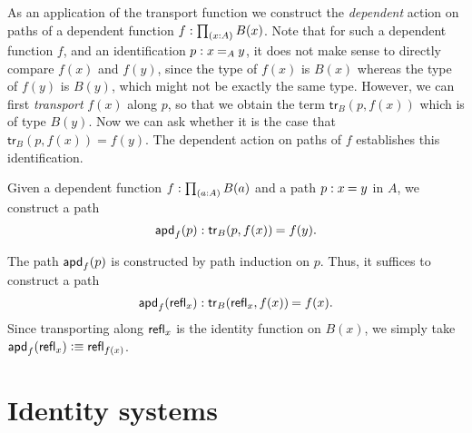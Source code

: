As an application of the transport function we construct the \emph{dependent} action on paths of a dependent function $f:\prd{x:A}B(x)$. Note that for such a dependent function $f$, and an identification $p:\id[A]{x}{y}$, it does not make sense to directly compare $f(x)$ and $f(y)$, since the type of $f(x)$ is $B(x)$ whereas the type of $f(y)$ is $B(y)$, which might not be exactly the same type. However, we can first \emph{transport} $f(x)$ along $p$, so that we obtain the term $\mathsf{tr}_B(p,f(x))$ which is of type $B(y)$. Now we can ask whether it is the case that $\mathsf{tr}_B(p,f(x))=f(y)$. The dependent action on paths of $f$ establishes this identification.

\begin{defn}\label{defn:apd}
Given a dependent function $f:\prd{a:A}B(a)$ and a path $p:\id{x}{y}$ in $A$, we construct a path
\begin{equation*}
\apd{f}{p} : \id{\mathsf{tr}_B(p,f(x))}{f(y)}.
\end{equation*}
\end{defn}

\begin{constr}
The path $\mathsf{apd}_{f}\mathopen{}\left(p\right)\mathclose{}$ is constructed by path induction on $p$. Thus, it suffices to construct a path
\begin{equation*}
\apd{f}{\refl{x}}:\id{\mathsf{tr}_B(\refl{x},f(x))}{f(x)}.
\end{equation*}
Since transporting along $\mathsf{refl}_{x}$ is the identity function on $B(x)$, we simply take $\mathsf{apd}_{f}\mathopen{}\left(\mathsf{refl}_{x}\right)\mathclose{}\vcentcolon\equiv\mathsf{refl}_{f(x)}$. 
\end{constr}

%

\section{Identity systems}

